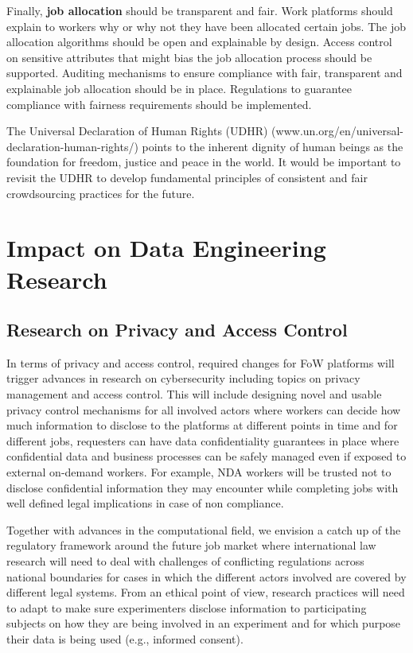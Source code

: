 \documentclass[11pt]{article}
\begin{document}
Finally, \textbf{job allocation} should be transparent and fair. Work platforms should explain to workers why or why not they have been allocated certain jobs. The job allocation algorithms should be open and explainable by design. Access control on sensitive attributes that might bias the job allocation process should be supported. Auditing mechanisms to ensure compliance with fair, transparent and explainable job allocation should be in place. Regulations to guarantee compliance with fairness requirements should be implemented. 

The Universal Declaration of Human Rights (UDHR) (www.un.org/en/universal-declaration-human-rights/) points to the inherent dignity of human beings as the foundation for freedom, justice and peace in the world. It would be important to revisit the UDHR to develop fundamental principles of consistent and fair crowdsourcing practices for the future. 

\section{Impact on Data Engineering Research}
\subsection{Research on Privacy and Access Control}
In terms of privacy and access control, required changes for FoW platforms will trigger advances in research on cybersecurity including topics on privacy management and access control. This will include designing novel and usable privacy control mechanisms for all involved actors where workers can decide how much information to disclose to the platforms at different points in time and for different jobs, requesters can have data confidentiality guarantees in place where confidential data and business processes can be safely managed even if exposed to external on-demand workers. For example, NDA workers will be trusted not to disclose confidential information they may encounter while completing jobs with well defined legal implications in case of non compliance.

Together with advances in the computational field, we envision a catch up of the regulatory framework around the future job market where international law research will need to deal with challenges of conflicting regulations across national boundaries for cases in which the different actors involved are covered by different legal systems.
From an ethical point of view, research practices will need to adapt to make sure experimenters disclose information to participating subjects on how they are being involved in an experiment and for which purpose their data is being used (e.g., informed consent). 
\end{document}
